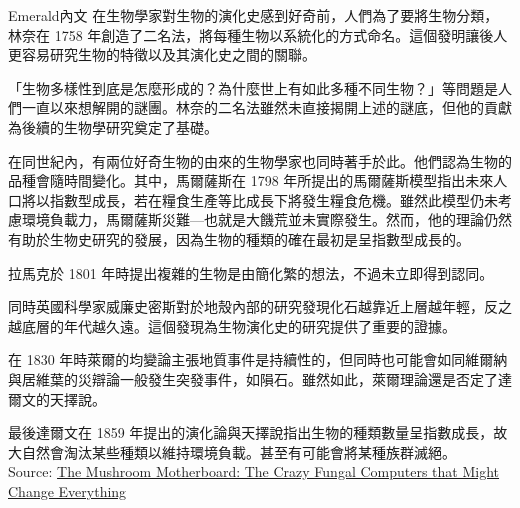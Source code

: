 \documentclass{article}
\begin{document}

\begin{boxpar}{Emerald}{內文}
在生物學家對生物的演化史感到好奇前，人們為了要將生物分類，林奈在 1758 年創造了二名法，將每種生物以系統化的方式命名。這個發明讓後人更容易研究生物的特徵以及其演化史之間的關聯。

「生物多樣性到底是怎麼形成的？為什麼世上有如此多種不同生物？」等問題是人們一直以來想解開的謎團。林奈的二名法雖然未直接揭開上述的謎底，但他的貢獻為後續的生物學研究奠定了基礎。

在同世紀內，有兩位好奇生物的由來的生物學家也同時著手於此。他們認為生物的品種會隨時間變化。其中，馬爾薩斯在 1798 年所提出的馬爾薩斯模型指出未來人口將以指數型成長，若在糧食生產等比成長下將發生糧食危機。雖然此模型仍未考慮環境負載力，馬爾薩斯災難—也就是大饑荒並未實際發生。然而，他的理論仍然有助於生物史研究的發展，因為生物的種類的確在最初是呈指數型成長的。

拉馬克於 1801 年時提出複雜的生物是由簡化繁的想法，不過未立即得到認同。

同時英國科學家威廉史密斯對於地殼內部的研究發現化石越靠近上層越年輕，反之越底層的年代越久遠。這個發現為生物演化史的研究提供了重要的證據。

在 1830 年時萊爾的均變論主張地質事件是持續性的，但同時也可能會如同維爾納與居維葉的災辯論一般發生突發事件，如隕石。雖然如此，萊爾理論還是否定了達爾文的天擇說。

最後達爾文在 1859
    年提出的演化論與天擇說指出生物的種類數量呈指數成長，故大自然會淘汰某些種類以維持環境負載。甚至有可能會將某種族群滅絕。\\
Source: \href{https://www.youtube.com/watch?v=5mIWo6dgTmI}{The Mushroom Motherboard: The Crazy Fungal Computers that Might Change Everything}
\end{boxpar}
\end{document}
